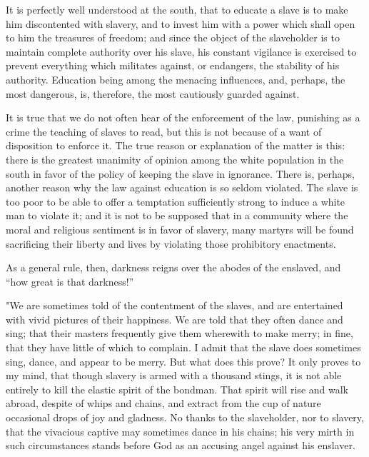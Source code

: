 It is perfectly well understood at the south, that to educate a slave is
to make him discontented with slavery, and to invest him with a power
which shall open to him the treasures of freedom; and since the object
of the slaveholder is to maintain complete authority over his slave, his
constant vigilance is exercised to prevent everything which militates
against, or endangers, the stability of his authority. Education being
among the menacing influences, and, perhaps, the most dangerous, is,
therefore, the most cautiously guarded against.

It is true that we do not often hear of the enforcement of the law,
punishing as a crime the teaching of slaves to read, but this is not
because of a want of disposition to enforce it. The true reason or
explanation of the matter is this: there is the greatest unanimity of
opinion among the white population in the south in favor of the policy
of keeping the slave in ignorance. There is, perhaps, another reason why
the law against education is so seldom violated. The slave is too poor
to be able to offer a temptation sufficiently strong to induce a white
man to violate it; and it is not to be supposed that in a community
where the moral and religious sentiment is in favor of slavery, many
martyrs will be found sacrificing their liberty and lives by violating
those prohibitory enactments.

As a general rule, then, darkness reigns over the abodes of the
enslaved, and ``how great is that darkness!''

"We are sometimes told of the contentment of the slaves, and are
{}entertained with vivid pictures of their happiness. We are told that
they often dance and sing; that their masters frequently give them
wherewith to make merry; in fine, that they have little of which to
complain. I admit that the slave does sometimes sing, dance, and appear
to be merry. But what does this prove? It only proves to my mind, that
though slavery is armed with a thousand stings, it is not able entirely
to kill the elastic spirit of the bondman. That spirit will rise and
walk abroad, despite of whips and chains, and extract from the cup of
nature occasional drops of joy and gladness. No thanks to the
slaveholder, nor to slavery, that the vivacious captive may sometimes
dance in his chains; his very mirth in such circumstances stands before
God as an accusing angel against his enslaver.

